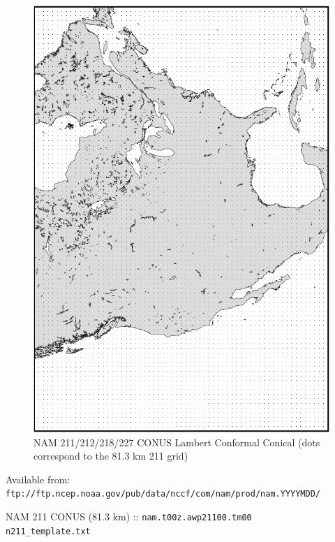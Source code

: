 \documentclass[11pt]{article}   %
\begin{document}
\begin{figure}[htbp]\begin{center}
 \includegraphics[angle=-90,scale=1.0]{Figs/n211.pdf}
\parbox{15cm}{\caption{\label{FigNAM211}
NAM 211/212/218/227 CONUS Lambert Conformal Conical (dots
correspond to the 81.3 km 211 grid)
}}
\end{center}\end{figure}
\clearpage

Available from:\\
\verb|ftp://ftp.ncep.noaa.gov/pub/data/nccf/com/nam/prod/nam.YYYYMDD/|

NAM 211 CONUS (81.3 km) :: \verb|nam.t00z.awp21100.tm00|\\
\verb|n211_template.txt| \\
\tiny  \normalsize
\end{document}
